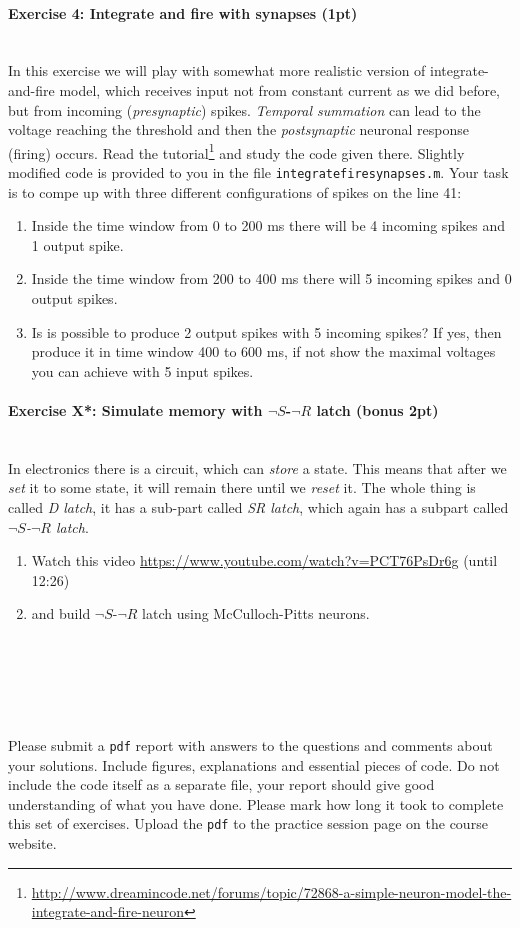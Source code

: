 \documentclass[a4paper,11pt]{article}
\newenvironment{exercise}[3]{\paragraph{Exercise #1: #2 (#3pt)}\ \\}{
\medskip}
\begin{document}
%
%
\begin{exercise}{4}{Integrate and fire with synapses}{1}
In this exercise we will play with somewhat more realistic version of integrate-and-fire model, which receives input not from constant current as we did before, but from incoming (\emph{presynaptic}) spikes. \emph{Temporal summation} can lead to the voltage reaching the threshold and then the \emph{postsynaptic} neuronal response (firing) occurs. Read the tutorial\footnote{\url{http://www.dreamincode.net/forums/topic/72868-a-simple-neuron-model-the-integrate-and-fire-neuron}} and study the code given there. Slightly modified code is provided to you in the file \texttt{integratefiresynapses.m}. Your task is to compe up with three different configurations of spikes on the line 41:
\begin{enumerate}
	\item Inside the time window from 0 to 200 ms there will be 4 incoming spikes and 1 output spike.
	\item Inside the time window from 200 to 400 ms there will 5 incoming spikes and 0 output spikes.
	\item Is is possible to produce 2 output spikes with 5 incoming spikes? If yes, then produce it in time window 400 to 600 ms, if not show the maximal voltages you can achieve with 5 input spikes.
\end{enumerate}
\end{exercise}


%
%
\begin{exercise}{X*}{Simulate memory with $\neg S$-$\neg R$ latch}{bonus 2}
In electronics there is a circuit, which can \emph{store} a state. This means that after we \emph{set} it to some state, it will remain there until we \emph{reset} it. The whole thing is called \emph{D latch}, it has a sub-part called \emph{SR latch}, which again has a subpart called \emph{$\neg S$-$\neg R$ latch}.
\begin{enumerate}
\itemsep 0em
	\item Watch this video \url{https://www.youtube.com/watch?v=PCT76PsDr6g} (until 12:26)
	\item and build $\neg S$-$\neg R$ latch using McCulloch-Pitts neurons. 
\end{enumerate}
\end{exercise}


\ \\
\ \\
\ \\
\ \\
\ \\
Please submit a \texttt{pdf} report with answers to the questions and comments about your solutions. Include figures, explanations and essential pieces of code. Do not include the code itself as a separate file, your report should give good understanding of what you have done. Please mark how long it took to complete this set of exercises. Upload the \texttt{pdf} to the practice session page on the course website.
\end{document}
